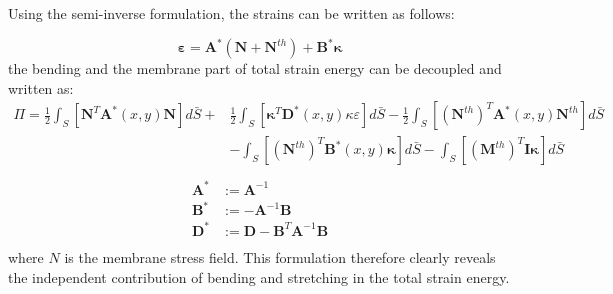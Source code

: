 \documentclass[journal]{new-aiaa}
\begin{document}
Using the semi-inverse formulation, the strains can be written as follows:

\begin{equation}
\boldsymbol\varepsilon= \boldsymbol A^\ast(\boldsymbol N + \boldsymbol N^{th})+ \boldsymbol B^\ast \boldsymbol\kappa
\label{eqn:semiconst}
\end{equation}
the bending and the membrane part of total strain energy can be decoupled and written as:
\begin{equation}
\begin{aligned}
{\Pi}= \frac{1}{2}\int_{S}\left[\boldsymbol N^T\boldsymbol A^\ast(x,y)\boldsymbol N\right]d\bar{S} +   & \frac{1}{2}\int_{S}\left[\boldsymbol\kappa^T\boldsymbol D^\ast(x,y)\kappa\varepsilon\right]d\bar{S} - \frac{1}{2}\int_{S}\left[(\boldsymbol {N}^{th})^T\boldsymbol A^\ast(x,y)\boldsymbol N^{th}\right]d\bar{S}  \\ & -  \int_{S}\left[(\boldsymbol {N}^{th})^T\boldsymbol B^\ast(x,y)\boldsymbol \kappa \right]d\bar{S}- \int_{S}\left[(\boldsymbol {M}^{th})^T\boldsymbol I\boldsymbol \kappa \right]d\bar{S}\\
\end{aligned}
\end{equation}
\begin{eqnarray}
\begin{aligned}
\boldsymbol{A}^\ast &:= \boldsymbol{A}^{-1} \\
\boldsymbol{B}^\ast &:= -\boldsymbol{A}^{-1} \boldsymbol{B}  \\
\boldsymbol{D}^\ast &:= \boldsymbol{D} - \boldsymbol{B}^{T} \boldsymbol{A}^{-1} \boldsymbol{B}  \\ 
\end{aligned}
\end{eqnarray}
where $N$ is the membrane stress field.
This formulation therefore clearly reveals the independent contribution of bending and stretching in the total strain energy.
\end{document}
